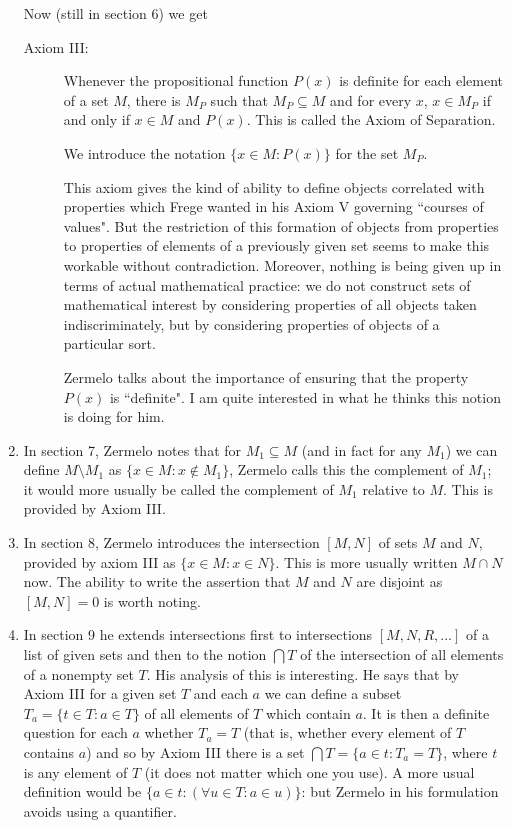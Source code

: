 \documentclass[12pt]{article}
\begin{document}
\begin{enumerate}
Now (still in section 6) we get

\begin{description}

\item[Axiom III:]  Whenever the propositional function $P(x)$ is definite for each element of a set $M$, there is $M_P$ such that $M_P \subseteq M$ and for every $x$,
$x \in M_P$ if and only if $x \in M$ and $P(x)$.  This is called the Axiom of Separation.

We introduce the notation $\{x \in M:P(x)\}$ for the set $M_P$.

This axiom gives the kind of ability to define objects correlated with properties which Frege wanted in his Axiom V governing ``courses of values".  But the restriction of
this formation of objects from properties to properties of elements of a previously given set seems to make this workable without contradiction.  Moreover, nothing is being given up
in terms of actual mathematical practice:  we do not construct sets of mathematical interest by considering properties of all objects taken indiscriminately, but by considering properties of objects of a particular sort.

Zermelo talks about the importance of ensuring that the property $P(x)$ is ``definite".  I am quite interested in what he thinks this notion is doing for him.

\end{description}

\item  In section 7, Zermelo notes that for $M_1 \subseteq M$ (and in fact for any $M_1$) we can define $M \setminus M_1$ as $\{x \in M: x \not\in M_1\}$,  Zermelo calls this the complement of $M_1$;  it would more usually be called the complement of $M_1$ relative to $M$.  This is provided by Axiom III.

\item In section 8, Zermelo introduces the intersection $[M,N]$ of sets $M$ and $N$, provided by axiom III as $\{x \in M:x \in N\}$.  This is more usually written $M \cap N$ now.  The ability to write the assertion that $M$ and $N$ are disjoint as $[M,N]=0$ is worth noting.

\item In section 9 he extends intersections first to intersections $[M,N,R, \ldots]$ of a list of given sets and then to the notion $\bigcap T$ of the intersection of all elements of
a nonempty set $T$.  His analysis of this is interesting.  He says that by Axiom III for a given set $T$ and each $a$ we can define a subset $T_a = \{t \in T:a \in T\}$ of all elements of $T$
which contain $a$.  It is then a definite question for each $a$ whether $T_a=T$ (that is, whether every element of $T$ contains $a$) and so by Axiom III there is a
set $\bigcap T = \{a \in t:T_a=T\}$, where $t$ is any element of $T$ (it does not matter which one you use).  A more usual definition would be $\{a \in t:(\forall u \in T:a \in u)\}$:  but Zermelo in his formulation avoids using a quantifier.


\end{enumerate}
\end{document}
